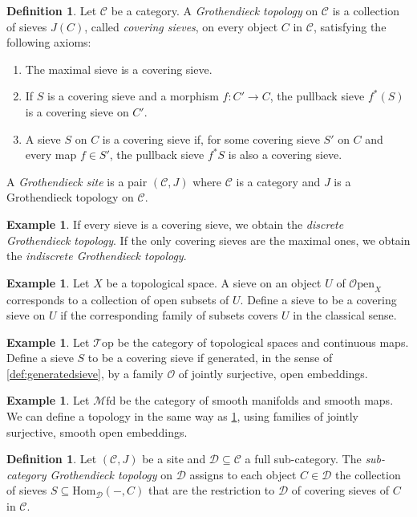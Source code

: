 \documentclass[10pt]{amsart}
\newcommand{\C}{\mathscr{C}}
\newcommand{\D}{\mathscr{D}}
\newcommand{\Hom}{\mathrm{Hom}}
\newcommand{\Top}{\mathscr{T}\mathrm{op}}
\newcommand{\Mfd}{\mathscr{M}\mathrm{fd}}
\newcommand{\Open}{\mathscr{O}\mathrm{pen}}
\theoremstyle{definition}
\newtheorem{definition}[equation]{Definition}
\newtheorem{example}[equation]{Example}
\theoremstyle{remark}
\numberwithin{equation}{section}
\begin{document}
	\begin{definition}
		Let $\C$ be a category. A \emph{Grothendieck topology} on $\C$ is a collection of sieves $J(C)$, called \textit{covering sieves}, on every object $C$ in $\C$, satisfying the following axioms:
		\begin{enumerate}
			\item The maximal sieve is a covering sieve.
			\item If $S$ is a covering sieve and a morphism $f\colon C' \to C$, the pullback sieve $f^*(S)$ is a covering sieve on $C'$.
			\item A sieve $S$ on $C$ is a covering sieve if, for some covering sieve $S'$ on $C$ and every map $f\in S'$, the pullback sieve $f^*S$ is also a covering sieve. 
		\end{enumerate}
		A \emph{Grothendieck site} is a pair $(\C, J)$ where $\C$ is a category and $J$ is a Grothendieck topology on $\C$.
	\end{definition}
	\begin{example}If every sieve is a covering sieve, we obtain the \emph{discrete Grothendieck topology}. If the only covering sieves are the maximal ones, we obtain the \textit{indiscrete Grothendieck topology}.
	\end{example}
	\begin{example}
		Let $X$ be a topological space. A sieve on an object $U$ of $\Open_X$ corresponds to a collection of open subsets of $U$. Define a sieve to be a covering sieve on $U$ if the corresponding family of subsets covers $U$ in the classical sense.
	\end{example}
	\begin{example}\label{ex:top}
		Let $\Top$ be the category of topological spaces and continuous maps. Define a sieve $S$ to be a covering sieve if generated, in the sense of \cref{def:generatedsieve}, by a family $\mathscr O$ of jointly surjective, open embeddings. 
	\end{example}
	\begin{example}Let $\Mfd$ be the category of smooth manifolds and smooth maps. We can define a topology in the same way as \cref{ex:top}, using families of jointly surjective, smooth open embeddings. 
	\end{example}
	\begin{definition}\label{def:indtop}
		Let $(\C,J)$ be a site and $\D\subseteq\C$ a full sub-category. The \emph{sub-category Grothendieck topology} on $\D$ assigns to each object $C\in\D$ the collection of sieves $S\subseteq\Hom_{\D}(-,C)$ that are the restriction to $\D$ of covering sieves of $C$ in $\C$.
	\end{definition}
\end{document}
